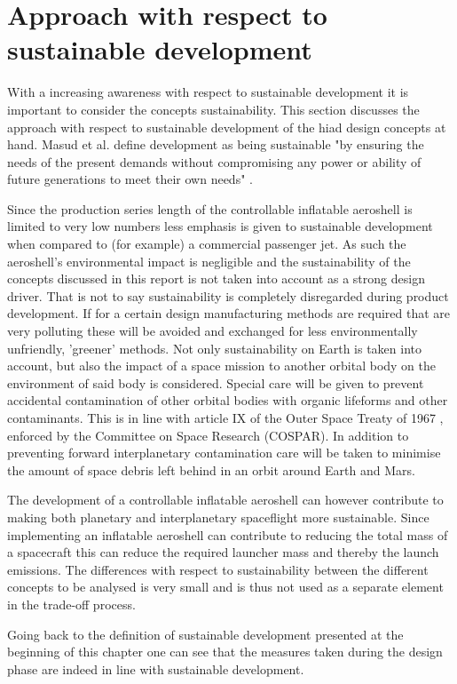 \section{Approach with respect to sustainable development}
\label{ch:sustain}

With a increasing awareness with respect to sustainable development it is important to consider the concepts sustainability. This section discusses the approach with respect to sustainable development of the \gls{hiad} design concepts at hand.
Masud et al. define development as being sustainable "by ensuring the needs of the present demands without compromising any power or ability of future generations to meet their own needs" \cite{Masud2011}.

Since the production series length of the controllable inflatable aeroshell is limited to very low numbers less emphasis is given to sustainable development when compared to (for example) a commercial passenger jet. As such the aeroshell's environmental impact is negligible and the sustainability of the concepts discussed in this report is not taken into account as a strong design driver. That is not to say sustainability is completely disregarded during product development. If for a certain design manufacturing methods are required that are very polluting these will be avoided and exchanged for less environmentally unfriendly, 'greener' methods. 
Not only sustainability on Earth is taken into account, but also the impact of a space mission to another orbital body on the environment of said body is considered. Special care will be given to prevent accidental contamination of other orbital bodies with organic lifeforms and other contaminants. This is in line with article IX of the Outer Space Treaty of 1967 \cite{UnitedNations2008}, enforced by the Committee on Space Research (COSPAR). In addition to preventing forward interplanetary contamination care will be taken to minimise the amount of space debris left behind in an orbit around Earth and Mars. 

The development of a controllable inflatable aeroshell can however contribute to making both planetary and interplanetary spaceflight more sustainable. Since implementing an inflatable aeroshell can contribute to reducing the total mass of a spacecraft this can reduce the required launcher mass and thereby the launch emissions. The differences with respect to sustainability between the different concepts to be analysed is very small and is thus not used as a separate element in the trade-off process.

Going back to the definition of sustainable development presented at the beginning of this chapter one can see that the measures taken during the design phase are indeed in line with sustainable development.